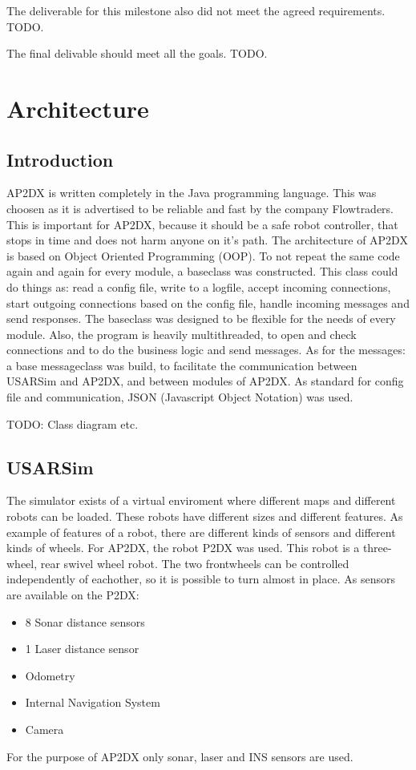 \documentclass[titlepage, a4paper,10pt]{article}
\begin{document}
The deliverable for this milestone also did not meet the agreed requirements. TODO.

The final delivable should meet all the goals. TODO.

\newpage

\section{Architecture}
\subsection{Introduction}
AP2DX is written completely in the Java programming language. 
This was choosen as it is advertised to be reliable and fast by the company Flowtraders. This is important for AP2DX, because it should be a safe robot controller, that stops in time and does not harm anyone on it's path. The architecture of AP2DX is based on Object Oriented Programming (OOP). 
To not repeat the same code again and again for every module, a baseclass was constructed. 
This class could do things as: read a config file, write to a logfile, accept incoming connections, start outgoing connections based on the config file, handle incoming messages and send responses. 
The baseclass was designed to be flexible for the needs of every module. Also, the program is heavily multithreaded, to open and check connections and to do the business logic and send messages. As for the messages: a base messageclass was build, to facilitate the communication between USARSim and AP2DX, and between modules of AP2DX. As standard for config file and communication, JSON (Javascript Object Notation) was used. 

TODO: Class diagram etc.

\subsection{USARSim}
The simulator exists of a virtual enviroment where different maps and different robots can be loaded. These robots have different sizes and different features. As example of features of a robot, there are different kinds of sensors and different kinds of wheels. For AP2DX, the robot P2DX was used. This robot is a three-wheel, rear swivel wheel robot. The two frontwheels can be controlled independently of eachother, so it is possible to turn almost in place. As sensors are available on the P2DX:
\begin{itemize}
\item 8 Sonar distance sensors
\item 1 Laser distance sensor
\item Odometry
\item Internal Navigation System
\item Camera
\end{itemize}
For the purpose of AP2DX only sonar, laser and INS sensors are used.
\end{document}

